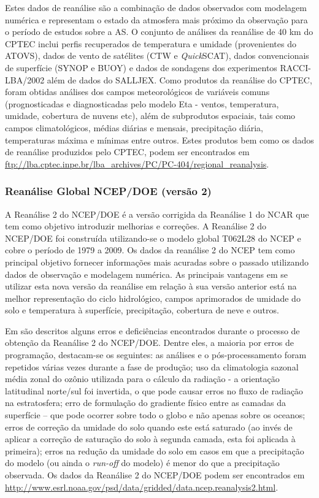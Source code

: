 Estes dados de reanálise são a combinação de dados observados com modelagem numérica e representam o estado da atmosfera mais próximo da observação para o período de estudos sobre a AS. O conjunto de análises da reanálise de 40 km do CPTEC inclui perfis recuperados de temperatura e umidade (provenientes do ATOVS), dados de vento de satélites (CTW e \textit{Quick}SCAT), dados convencionais de superfície (SYNOP e BUOY) e dados de sondagens dos experimentos RACCI-LBA/2002 \cite{silvadiasetal03} além de dados do SALLJEX. Como produtos da reanálise do CPTEC, foram obtidas análises dos campos meteorológicos de variáveis comuns (prognosticadas e diagnosticadas pelo modelo Eta - ventos, temperatura, umidade, cobertura de nuvens etc), além de subprodutos espaciais, tais como campos climatológicos, médias diárias e mensais, precipitação diária, temperaturas máxima e mínimas entre outros. Estes produtos bem como os dados de reanálise produzidos pelo CPTEC, podem ser encontrados em \url{ftp://lba.cptec.inpe.br/lba_archives/PC/PC-404/regional_reanalysis}.

\subsubsection{Reanálise Global NCEP/DOE (versão 2)}

A Reanálise 2 do NCEP/DOE \cite{kanamitsuetal02} é a versão corrigida da Reanálise 1 do NCAR \cite{kalnayetal96} que tem como objetivo introduzir melhorias e correções. A Reanálise 2 do NCEP/DOE foi construída utilizando-se o modelo global T062L28 do NCEP e cobre o período de 1979 a 2009. Os dados da reanálise 2 do NCEP tem como principal objetivo fornecer informações mais acuradas sobre o passado utilizando dados de observação e modelagem numérica. As principais vantagens em se utilizar esta nova versão da reanálise em relação à sua versão anterior está na melhor representação do ciclo hidrológico, campos aprimorados de umidade do solo e temperatura à superfície, precipitação, cobertura de neve e outros.

Em  são descritos alguns erros e deficiências encontrados durante o processo de obtenção da Reanálise 2 do NCEP/DOE. Dentre eles, a maioria por erros de programação, destacam-se os seguintes: as análises e o pós-processamento foram repetidos várias vezes durante a fase de produção; uso da climatologia sazonal média zonal do ozônio utilizada para o cálculo da radiação - a orientação latitudinal norte/sul foi invertida, o que pode causar erros no fluxo de radiação na estratosfera; erro de formulação do gradiente físico entre as camadas da superfície – que pode ocorrer sobre todo o globo e não apenas sobre os oceanos; erros de correção da umidade do solo quando este está saturado (ao invés de aplicar a correção de saturação do solo à segunda camada, esta foi aplicada à primeira); erros na redução da umidade do solo em casos em que a precipitação do modelo (ou ainda o \textit{run-off} do modelo) é menor do que a precipitação observada. Os dados da Reanálise 2 do NCEP/DOE podem ser encontrados em \url{http://www.esrl.noaa.gov/psd/data/gridded/data.ncep.reanalysis2.html}.

